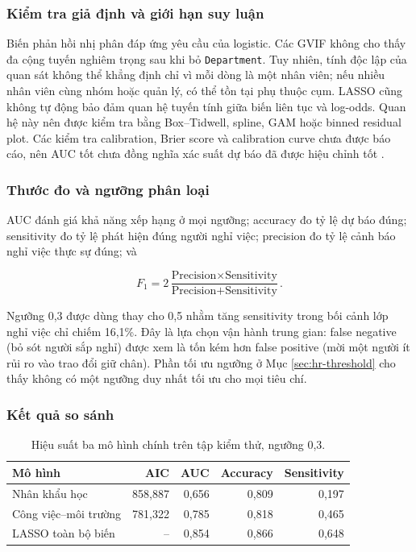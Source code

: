 \subsubsection{Kiểm tra giả định và giới hạn suy luận}

Biến phản hồi nhị phân đáp ứng yêu cầu của logistic. Các GVIF không cho
thấy đa cộng tuyến nghiêm trọng sau khi bỏ \texttt{Department}. Tuy
nhiên, tính độc lập của quan sát không thể khẳng định chỉ vì mỗi dòng là
một nhân viên; nếu nhiều nhân viên cùng nhóm hoặc quản lý, có thể tồn tại
phụ thuộc cụm. LASSO cũng không tự động bảo đảm quan hệ tuyến tính giữa
biến liên tục và log-odds. Quan hệ này nên được kiểm tra bằng
Box--Tidwell, spline, GAM hoặc binned residual plot. Các kiểm tra
calibration, Brier score và calibration curve chưa được báo cáo, nên AUC
tốt chưa đồng nghĩa xác suất dự báo đã được hiệu chỉnh tốt
\cite{hosmer2013,steyerberg2010}.

\subsubsection{Thước đo và ngưỡng phân loại}

AUC đánh giá khả năng xếp hạng ở mọi ngưỡng; accuracy đo tỷ lệ dự báo
đúng; sensitivity đo tỷ lệ phát hiện đúng người nghỉ việc; precision đo
tỷ lệ cảnh báo nghỉ việc thực sự đúng; và

\[
F_1=2\frac{\text{Precision}\times\text{Sensitivity}}
{\text{Precision}+\text{Sensitivity}}.
\]

Ngưỡng 0,3 được dùng thay cho 0,5 nhằm tăng sensitivity trong bối cảnh
lớp nghỉ việc chỉ chiếm 16,1\%. Đây là lựa chọn vận hành trung gian:
false negative (bỏ sót người sắp nghỉ) được xem là tốn kém hơn false
positive (mời một người ít rủi ro vào trao đổi giữ chân). Phần tối ưu
ngưỡng ở Mục \ref{sec:hr-threshold} cho thấy không có một ngưỡng duy
nhất tối ưu cho mọi tiêu chí.

\subsubsection{Kết quả so sánh}

\begin{table}[H]
\centering
\caption{Hiệu suất ba mô hình chính trên tập kiểm thử, ngưỡng 0,3.}
\label{tab:hr-main-comparison}
\begin{tabular}{lrrrr}
\toprule
Mô hình & AIC & AUC & Accuracy & Sensitivity\\
\midrule
Nhân khẩu học & 858,887 & 0,656 & 0,809 & 0,197\\
Công việc--môi trường & 781,322 & 0,785 & 0,818 & 0,465\\
LASSO toàn bộ biến & -- & 0,854 & 0,866 & 0,648\\
\bottomrule
\end{tabular}
\end{table}

